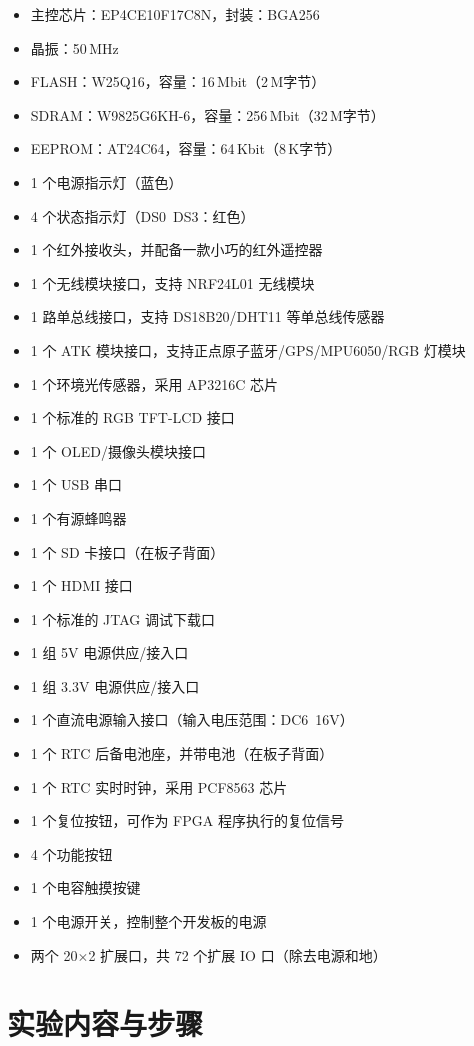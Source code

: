 \documentclass[UTF8]{article}
\theoremstyle{MyLineTheoremStyle} %
\theoremstyle{MyBlockTheoremStyle} %
\theoremstyle{MySubsubsectionStyle} %
\begin{document}
\begin{itemize}
    \item 主控芯片：EP4CE10F17C8N，封装：BGA256
    \item 晶振：50\,MHz
    \item FLASH：W25Q16，容量：16\,Mbit（2\,M字节）
    \item SDRAM：W9825G6KH-6，容量：256\,Mbit（32\,M字节）
    \item EEPROM：AT24C64，容量：64\,Kbit（8\,K字节）
    \item 1 个电源指示灯（蓝色）
    \item 4 个状态指示灯（DS0~DS3：红色）
    \item 1 个红外接收头，并配备一款小巧的红外遥控器
    \item 1 个无线模块接口，支持 NRF24L01 无线模块
    \item 1 路单总线接口，支持 DS18B20/DHT11 等单总线传感器
    \item 1 个 ATK 模块接口，支持正点原子蓝牙/GPS/MPU6050/RGB 灯模块
    \item 1 个环境光传感器，采用 AP3216C 芯片
    \item 1 个标准的 RGB TFT-LCD 接口
    \item 1 个 OLED/摄像头模块接口
    \item 1 个 USB 串口
    \item 1 个有源蜂鸣器
    \item 1 个 SD 卡接口（在板子背面）
    \item 1 个 HDMI 接口
    \item 1 个标准的 JTAG 调试下载口
    \item 1 组 5V 电源供应/接入口
    \item 1 组 3.3V 电源供应/接入口
    \item 1 个直流电源输入接口（输入电压范围：DC6~16V）
    \item 1 个 RTC 后备电池座，并带电池（在板子背面）
    \item 1 个 RTC 实时时钟，采用 PCF8563 芯片
    \item 1 个复位按钮，可作为 FPGA 程序执行的复位信号
    \item 4 个功能按钮
    \item 1 个电容触摸按键
    \item 1 个电源开关，控制整个开发板的电源
    \item 两个 20$\times$2 扩展口，共 72 个扩展 IO 口（除去电源和地）
\end{itemize}

\section{实验内容与步骤}
\end{document}
